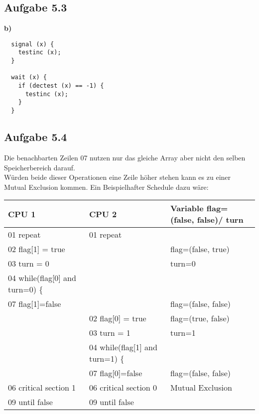 \documentclass[a4paper,graphics,11pt]{article}
\newcommand{\aufgabe}[1]{\subsection*{Aufgabe #1}}
\begin{document}
{{{{ \aufgabe{5.3}

 \textbf{b)}

 \begin{lstlisting}
  signal (x) {
    testinc (x);
  }

  wait (x) {
    if (dectest (x) == -1) {
      testinc (x);
    }
  }
 \end{lstlisting}

\aufgabe{5.4}
Die benachbarten Zeilen 07 nutzen nur das gleiche Array aber nicht den selben Speicherbereich darauf.\\
Würden beide dieser Operationen eine Zeile höher stehen kann es zu einer Mutual Exclusion kommen. Ein Beispielhafter Schedule dazu wäre:\\
\newline
\begin{tabular}{l | l | l}
CPU 1 		& CPU 2		&  Variable flag=(false, false)/ turn	\\
\toprule
01 repeat  	& 01 repeat			&			\\
\midrule
02 flag[1] = true	&			& flag=(false, true)	\\
\midrule
03 turn = 0     	&			& turn=0\\
\midrule
04 while(flag[0] and turn=0) \{ 	&			&\\
\midrule
07 flag[1]=false	&			& flag=(false, false)\\
\midrule
&02 flag[0] = true	& flag=(true, false)	\\
\midrule
&03 turn = 1  & turn=1\\
\midrule
&04 while(flag[1] and turn=1) \{	&\\
\midrule
& 07 flag[0]=false & flag=(false, false)\\
\midrule
06 critical section 1 & 06 critical section 0 & Mutual Exclusion\\
\bottomrule
09 until false & 09 until false &
\end{tabular}

}}}}
\end{document}
